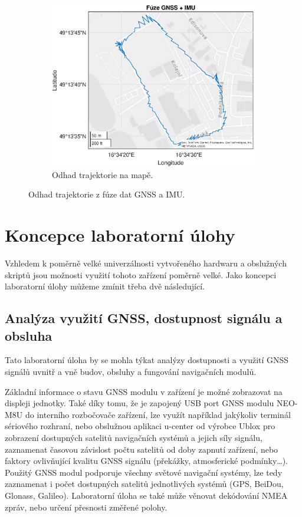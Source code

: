 \begin{figure}[h]
\begin{subfigure}[b]{0.49\textwidth}
     \end{subfigure}
     \hfill
     \centering
     \begin{subfigure}[b]{0.49\textwidth}
         \centering
         \includegraphics[width=\textwidth]{obrazky/matlab/2gnssIMU}
         \caption{Odhad trajektorie na mapě.}   
         
     \end{subfigure}
     
     \caption{Odhad trajektorie z fúze dat GNSS a IMU.}
     \label{fig:gnnsIMUFusion}  
\end{figure}

\chapter{Koncepce laboratorní úlohy}
Vzhledem k poměrně velké univerzálnosti vytvořeného hardwaru a obslužných skriptů jsou možnosti využití tohoto zařízení poměrně velké. Jako koncepci laboratorní úlohy můžeme zmínit třeba dvě následující.
\section{Analýza využití GNSS, dostupnost signálu a obsluha}
Tato laboratorní úloha by se mohla týkat analýzy dostupnosti a využití GNSS signálů uvnitř a vně budov, obsluhy a fungování navigačních modulů. 

Základní informace o stavu GNSS modulu v zařízení je možné zobrazovat na displeji jednotky. Také díky tomu, že je zapojený USB port GNSS modulu NEO-M8U do interního rozbočovače zařízení, lze využít například jakýkoliv terminál sériového rozhraní, nebo obslužnou aplikaci u-center od výrobce Ublox pro zobrazení dostupných satelitů navigačních systémů a jejich síly signálu, zaznamenat časovou závislost počtu satelitů od doby zapnutí zařízení, nebo faktory ovlivňující kvalitu GNSS signálu (překážky, atmosferické podmínky\ldots). Použitý GNSS modul podporuje všechny světové navigační systémy, lze tedy zaznamenat i počet dostupných satelitů jednotlivých systémů (GPS, BeiDou, Glonass, Galileo). Laboratorní úloha se také může věnovat dekódování NMEA zpráv, nebo určení přesnosti změřené polohy.


